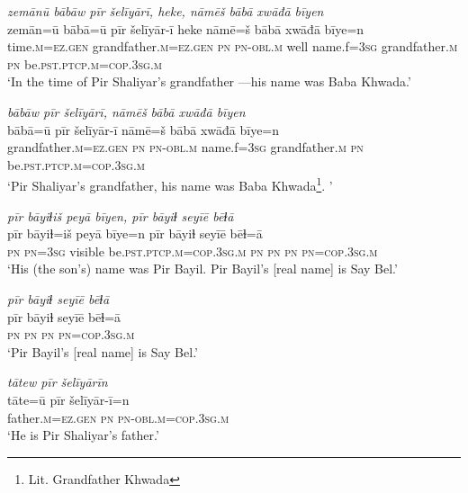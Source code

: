 \ea \label{BP.1}
\textit{zemānū bābāw pīr šelīyārī, heke, nāmēš bābā xwāđā bīyen} \\ 
\gll zemān=ū bābā=ū pīr šelīyār-ī heke nāmē=š bābā xwāđā bīye=n \\ 
 time\textsc{.m}\textsc{=ez.gen} grandfather\textsc{.m}\textsc{=ez.gen} \textsc{pn} \textsc{pn}\textsc{-obl}\textsc{.m} well name.f\textsc{=3sg} grandfather\textsc{.m} \textsc{pn} be\textsc{.pst}\textsc{.ptcp}\textsc{.m}\textsc{=cop}\textsc{.3sg}\textsc{.m} \\ 
\glt `In the time of Pir Shaliyar’s grandfather —his name was Baba Khwada.'
\z 
 
\ea \label{BP.2}
\textit{bābāw pīr šelīyārī, nāmēš bābā xwāđā bīyen} \\ 
\gll bābā=ū pīr šelīyār-ī nāmē=š bābā xwāđā bīye=n \\ 
 grandfather\textsc{.m}\textsc{=ez.gen} \textsc{pn} \textsc{pn}\textsc{-obl}\textsc{.m} name.f\textsc{=3sg} grandfather\textsc{.m} \textsc{pn} be\textsc{.pst}\textsc{.ptcp}\textsc{.m}\textsc{=cop}\textsc{.3sg}\textsc{.m} \\ 
\glt `Pir Shaliyar’s grandfather, his name was Baba Khwada\footnote{Lit. Grandfather Khwada}. '
\z 
 
\ea \label{BP.5}
\textit{pīr bāyiɫiš peyā bīyen, pīr bāyiɫ seyīē bēɫā} \\ 
\gll pīr bāyiɫ=iš peyā bīye=n pīr bāyiɫ seyīē bēɫ=ā \\ 
 \textsc{pn} \textsc{pn}\textsc{=3sg} visible be\textsc{.pst}\textsc{.ptcp}\textsc{.m}\textsc{=cop}\textsc{.3sg}\textsc{.m} \textsc{pn} \textsc{pn} \textsc{pn} \textsc{pn}\textsc{=cop}\textsc{.3sg}\textsc{.m} \\ 
\glt `His (the son’s) name was Pir Bayil. Pir Bayil’s [real name] is Say Bel.'
\z 
 
\ea \label{BP.6}
\textit{pīr bāyiɫ seyīē bēɫā} \\ 
\gll pīr bāyiɫ seyīē bēɫ=ā \\ 
 \textsc{pn} \textsc{pn} \textsc{pn} \textsc{pn}\textsc{=cop}\textsc{.3sg}\textsc{.m} \\ 
\glt `Pir Bayil’s [real name] is Say Bel.'
\z 
 
\ea \label{BP.7}
\textit{tātew pīr šelīyārīn} \\ 
\gll tāte=ū pīr šelīyār-ī=n \\ 
 father\textsc{.m}\textsc{=ez.gen} \textsc{pn} \textsc{pn}\textsc{-obl}\textsc{.m}\textsc{=cop}\textsc{.3sg}\textsc{.m} \\ 
\glt `He is Pir Shaliyar’s father.'
\z 
 
